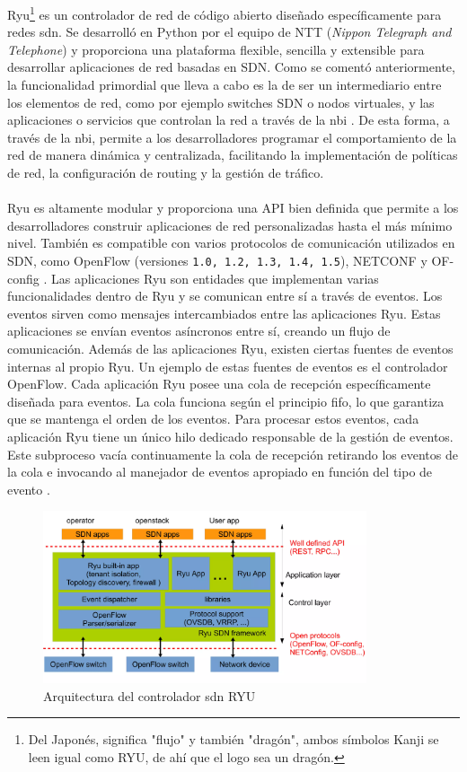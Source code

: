 Ryu\footnote{Del Japonés, significa "flujo" y también "dragón", ambos símbolos Kanji se leen igual como RYU, de ahí que el logo sea un dragón.} es un controlador de red de código abierto diseñado específicamente para redes \gls{sdn}. Se desarrolló en Python por el equipo de NTT (\textit{Nippon Telegraph and Telephone}) y proporciona una plataforma flexible, sencilla y extensible para desarrollar aplicaciones de red basadas en SDN. Como se comentó anteriormente, la funcionalidad primordial que lleva a cabo es la de ser un intermediario entre los elementos de red, como por ejemplo switches SDN o nodos virtuales, y las aplicaciones o servicios que controlan la red a través de la \gls{nbi} \cite{tomonori2013introduction}. De esta forma, a través de la \gls{nbi}, permite a los desarrolladores programar el comportamiento de la red de manera dinámica y centralizada, facilitando la implementación de políticas de red, la configuración de routing y la gestión de tráfico.\\
\\
Ryu es altamente modular y proporciona una API bien definida que permite a los desarrolladores construir aplicaciones de red personalizadas hasta el más mínimo nivel. También es compatible con varios protocolos de comunicación utilizados en SDN, como OpenFlow (versiones \texttt{1.0, 1.2, 1.3, 1.4, 1.5}), NETCONF y OF-config \cite{tomonori2013introduction}.  Las aplicaciones Ryu son entidades que implementan varias funcionalidades dentro de Ryu y se comunican entre sí a través de eventos. Los eventos sirven como mensajes intercambiados entre las aplicaciones Ryu. Estas aplicaciones se envían eventos asíncronos entre sí, creando un flujo de comunicación. Además de las aplicaciones Ryu, existen ciertas fuentes de eventos internas al propio Ryu. Un ejemplo de estas fuentes de eventos es el controlador OpenFlow. Cada aplicación Ryu posee una cola de recepción específicamente diseñada para eventos. La cola funciona según el principio \gls{fifo}, lo que garantiza que se mantenga el orden de los eventos. Para procesar estos eventos, cada aplicación Ryu tiene un único hilo dedicado responsable de la gestión de eventos. Este subproceso vacía continuamente la cola de recepción retirando los eventos de la cola e invocando al manejador de eventos apropiado en función del tipo de evento \cite{ryu1}.

\newpage

\begin{figure}[ht]
    \centering
    \includegraphics[width=0.85\textwidth]{archivos/img/teoria/ryu.png}
    \caption{Arquitectura del controlador \gls{sdn} RYU \cite{ryu2}}
    \label{fig:ryu}
\end{figure}

